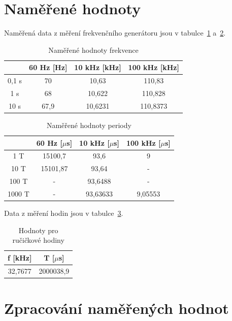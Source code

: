 \documentclass[a4paper,12pt]{article}   %
\newcommand{\tmu}{$\mu$}
\begin{document}
\section{Naměřené hodnoty}
Naměřená data z měření frekvenčního generátoru jsou v tabulce~\ref{tab:frce} a~\ref{tab:perioda}.

\begin{table}[h!]
  \centering
  \begin{tabular}{|c|c|c|c|}
      &60 Hz [Hz]&10 kHz [kHz]&100 kHz [kHz]\\\hline\hline
    0,1 s&70&10,63&110,83\\\hline
    1 s&68&10,622&110,828\\\hline
    10 s&67,9&10,6231&110,8373\\\hline
  \end{tabular}
  \label{tab:frce}
  \caption{Naměřené hodnoty frekvence}
\end{table}

\begin{table}[h!]
  \centering
  \begin{tabular}{|c|c|c|c|}
    &60 Hz [\tmu s]&10 kHz [\tmu s]&100 kHz [\tmu s]\\\hline\hline
    1 T&15100,7&93,6&9\\\hline
    10 T &15101,87&93,64&-\\\hline
    100 T&-&93,6488&-\\\hline
    1000 T&-&93,63633&9,05553\\\hline
  \end{tabular}
  \label{tab:perioda}
  \caption{Naměřené hodnoty periody}
\end{table}

Data z měření hodin jsou v tabulce~\ref{tab:hodiny}.

\begin{table}
  \begin{tabular}{|c|c|}
    f [kHz]&T [\tmu s]\\\hline\hline
    32,7677&2000038,9\\\hline
  \end{tabular}
  \caption{Hodnoty pro ručičkové hodiny}
  \label{tab:hodiny}
\end{table}




\section{Zpracování naměřených hodnot}
\end{document}
